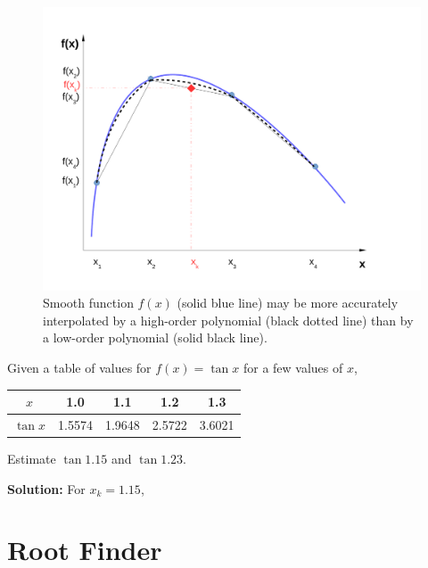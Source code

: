      \begin{figure}[h]\label{Appendix:Fig:Interpolation}%
        \begin{center}
          \includegraphics[width=\columnwidth,clip]{./Pics/Interpolation}
           \caption{Smooth function $f(x)$ (solid blue line) may be more accurately interpolated by a high-order polynomial (black dotted line) than by a low-order polynomial (solid black line).} 
        \end{center}
      \end{figure}

    \begin{list}{\bf Example :~}{}
%       
         \item Given a table of values for $f(x)=\tan{x}$ for a few values of $x$,
            \begin{center}
               \begin{tabular}{c | c c c c}
                   $x$        & 1.0 & 1.1 & 1.2 & 1.3 \\
                   \hline
                   $\tan{x}$  & 1.5574 & 1.9648 & 2.5722 & 3.6021\\
               \end{tabular}
            \end{center}
            Estimate $\tan{1.15}$ and $\tan{1.23}$.

            {\bf Solution:} For $x_{k}=1.15$,
%
    \end{list}

\section{Root Finder}
